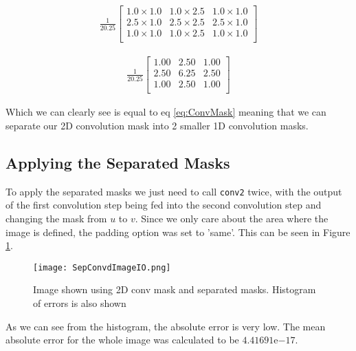 \begin{gather}
    \frac{1}{20.25}
    \begin{bmatrix}
        1.0 \times 1.0 & 1.0 \times 2.5 & 1.0 \times 1.0 \\
        2.5 \times 1.0 & 2.5 \times 2.5 & 2.5 \times 1.0 \\
        1.0 \times 1.0 & 1.0 \times 2.5 & 1.0 \times 1.0 \\
    \end{bmatrix}
\end{gather}

\begin{gather}
    \frac{1}{20.25}
    \begin{bmatrix}
        1.00 & 2.50 & 1.00 \\
        2.50 & 6.25 & 2.50 \\
        1.00 & 2.50 & 1.00 \\
    \end{bmatrix}
\end{gather}

\noindent Which we can clearly see is equal to eq \ref{eq:ConvMask} meaning that we can separate our 2D convolution mask into 2 smaller 1D convolution masks.

\subsection{Applying the Separated Masks}
To apply the separated masks we just need to call \textcolor{MATLABBlue}{\lstinline|conv2|} twice, with the output of the first convolution step being fed into the second convolution step and changing the mask from $u$ to $v$. Since we only care about the area where the image is defined, the padding option was set to \textcolor{MATLABPurple}{'same'}. This can be seen in Figure \ref{fig:SepConvIO}.

\begin{figure}[!h]
    \texttt{[image: SepConvdImageIO.png]}
    \centering
    \caption{Image shown using 2D conv mask and separated masks. Histogram of errors is also shown}
    \label{fig:SepConvIO}
\end{figure}

\noindent As we can see from the histogram, the absolute error is very low. The mean absolute error for the whole image was calculated to be $4.41691\mathrm{e}{-17}$.
